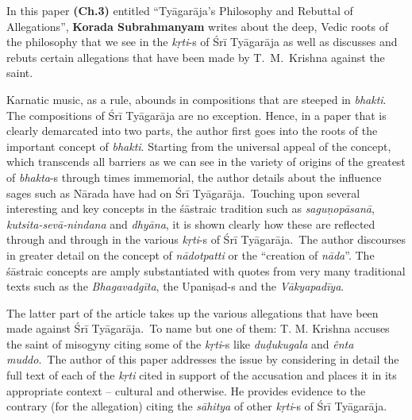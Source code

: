 In this paper \textbf{(Ch.3)} entitled “Tyāgarāja’s Philosophy and Rebuttal of Allegations”, \textbf{Korada Subrahmanyam} writes about the deep, Vedic roots of the philosophy that we see in the \textit{kṛti}-s of Śrī Tyāgarāja as well as discusses and rebuts certain allegations that have been made by T.~M.~Krishna against the saint.

Karnatic music, as a rule, abounds in compositions that are steeped in \textit{bhakti}. The compositions of Śrī Tyāgarāja are no exception. Hence, in a paper that is clearly demarcated into two parts, the author first goes into the roots of the important concept of \textit{bhakti}. Starting from the universal appeal of the concept, which transcends all barriers as we can see in the variety of origins of the greatest of \textit{bhakta}-s through times immemorial, the author details about the influence sages such as Nārada have had on Śrī Tyāgarāja.~Touching upon several interesting and key concepts in the śāstraic tradition such as \textit{saguṇopāsanā}, \textit{kutsita-sevā-nindana} and \textit{dhyāna}, it is shown clearly how these are reflected through and through in the various \textit{kṛti}-s of Śrī Tyāgarāja.~The author discourses in greater detail on the concept of \textit{nādotpatti} or the “creation of \textit{nāda}”. The śāstraic concepts are amply substantiated with quotes from very many traditional texts such as the \textit{Bhagavadgīta}, the Upaniṣad-s and the \textit{Vākyapadīya}.

The latter part of the article takes up the various allegations that have been made against Śrī Tyāgarāja.~To name but one of them: T. M. Krishna accuses the saint of misogyny citing some of the \textit{kṛti}-s like \textit{duḍukugala} and \textit{ênta muddo}.~The author of this paper addresses the issue by considering in detail the full text of each of the \textit{kṛti} cited in support of the accusation and places it in its appropriate context – cultural and otherwise. He provides evidence to the contrary (for the allegation) citing the \textit{sāhitya} of other \textit{kṛti}-s of Śrī Tyāgarāja.


